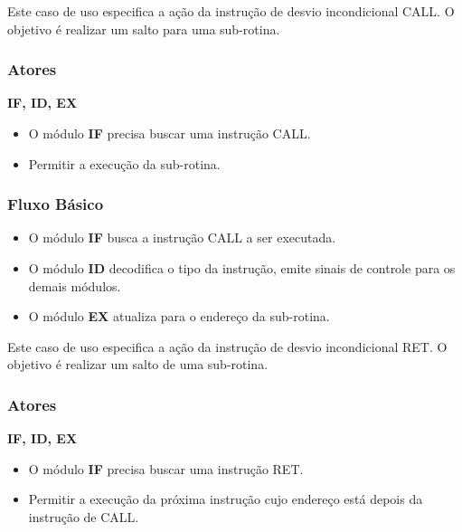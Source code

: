 
Este caso de uso especifica a ação da instrução de desvio incondicional CALL. O objetivo é realizar um salto para uma sub-rotina.

\subsubsection*{Atores}
\textbf{IF, ID, EX}

\preconditions 
\begin{itemize}
	\item O módulo \textbf{IF} precisa buscar uma instrução CALL.
\end{itemize}

\postconditions
\begin{itemize}
	\item Permitir a execução da sub-rotina.
\end{itemize}

\subsubsection*{Fluxo Básico}
\begin{itemize}
	\item O módulo \textbf{IF} busca a instrução CALL a ser executada.
	\item O módulo \textbf{ID} decodifica o tipo da instrução, emite sinais de controle para os demais módulos.
	\item O módulo \textbf{EX} atualiza para o endereço da sub-rotina.
\end{itemize}


Este caso de uso especifica a ação da instrução de desvio incondicional RET. O objetivo é realizar um salto de uma sub-rotina.

\subsubsection*{Atores}
\textbf{IF, ID, EX}

\preconditions 
\begin{itemize}
	\item O módulo \textbf{IF} precisa buscar uma instrução RET.
\end{itemize}

\postconditions
\begin{itemize}
	\item Permitir a execução da próxima instrução cujo endereço está depois da instrução de CALL.
\end{itemize}


